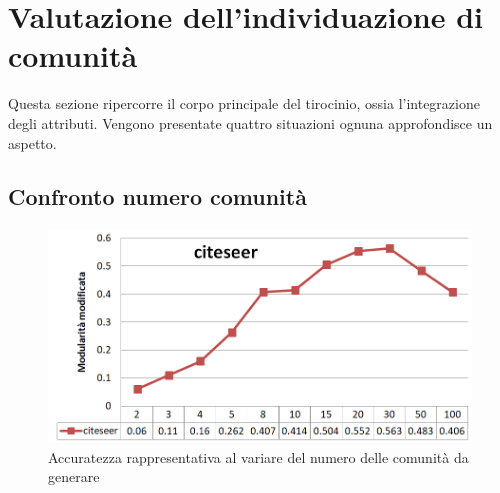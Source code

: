 \section{Valutazione dell'individuazione di comunità}
Questa sezione ripercorre il corpo principale del tirocinio, ossia l'integrazione degli attributi. Vengono presentate quattro situazioni ognuna approfondisce un aspetto.
%
\subsection{Confronto numero comunità}
%
\begin{figure}[htp]
	\centering
	\includegraphics[width=\linewidth]{immagini/MOD_1_num_cmty}
	\caption{Accuratezza rappresentativa al variare del numero delle comunità da generare}
	\label{fig:MOD_1_num_cmty}
\end{figure}
%

